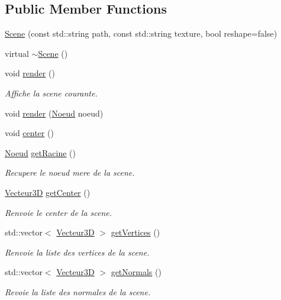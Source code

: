 \subsection*{Public Member Functions}
\begin{DoxyCompactItemize}
\item 
\hyperlink{class_scene_a91c732aff24d5b35d65a0f6e2fdfcd3a}{Scene} (const std\+::string path, const std\+::string texture, bool reshape=false)
\item 
virtual \hyperlink{class_scene_a3b8cec2e32546713915f8c6303c951f1}{$\sim$\+Scene} ()
\item 
void \hyperlink{class_scene_a4ddf2d16f371ee9533b3faf1dd5ddfb1}{render} ()
\begin{DoxyCompactList}\small\item\em Affiche la scene courante. \end{DoxyCompactList}\item 
void \hyperlink{class_scene_af0747116905b9098ba3bd2c9d4b67162}{render} (\hyperlink{class_noeud}{Noeud} noeud)
\item 
void \hyperlink{class_scene_a1184bf60ec953a9ae9f6b979cfcc8f69}{center} ()
\item 
\hyperlink{class_noeud}{Noeud} \hyperlink{class_scene_a6d9239ca059ca24b0a767aebc1c9a63b}{get\+Racine} ()
\begin{DoxyCompactList}\small\item\em Recupere le noeud mere de la scene. \end{DoxyCompactList}\item 
\hyperlink{class_vecteur3_d}{Vecteur3\+D} \hyperlink{class_scene_ada5afef61a8061abb6d3dfb38802f551}{get\+Center} ()
\begin{DoxyCompactList}\small\item\em Renvoie le center de la scene. \end{DoxyCompactList}\item 
std\+::vector$<$ \hyperlink{class_vecteur3_d}{Vecteur3\+D} $>$ \hyperlink{class_scene_a899e0ef799504383505743ebecc58406}{get\+Vertices} ()
\begin{DoxyCompactList}\small\item\em Renvoie la liste des vertices de la scene. \end{DoxyCompactList}\item 
std\+::vector$<$ \hyperlink{class_vecteur3_d}{Vecteur3\+D} $>$ \hyperlink{class_scene_a98442b4ed5ff289a695d9a6eea7b6ebd}{get\+Normals} ()
\begin{DoxyCompactList}\small\item\em Revoie la liste des normales de la scene. \end{DoxyCompactList}\end{DoxyCompactItemize}
